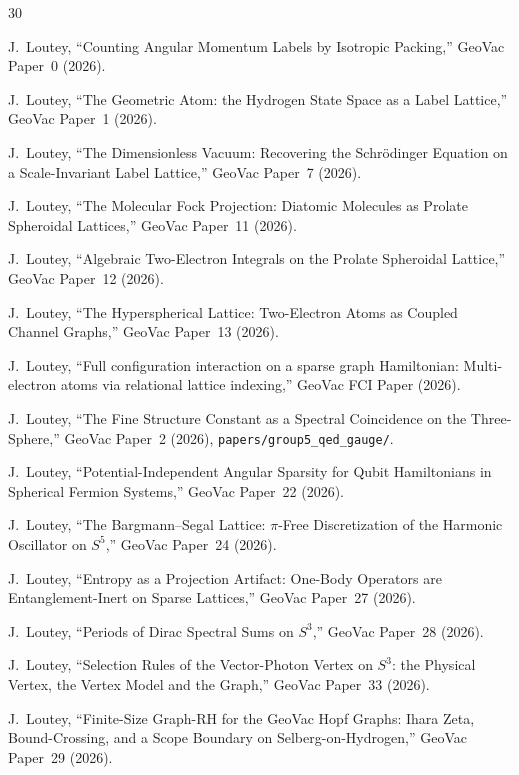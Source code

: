 \documentclass[aps,pra,twocolumn,superscriptaddress,longbibliography]{revtex4-2}
\begin{document}
\begin{thebibliography}{30}

J.~Loutey,
``Counting Angular Momentum Labels by Isotropic Packing,''
GeoVac Paper~0 (2026).

J.~Loutey,
``The Geometric Atom: the Hydrogen State Space as a Label Lattice,''
GeoVac Paper~1 (2026).

J.~Loutey,
``The Dimensionless Vacuum: Recovering the Schr\"odinger Equation
on a Scale-Invariant Label Lattice,''
GeoVac Paper~7 (2026).

J.~Loutey,
``The Molecular Fock Projection: Diatomic Molecules as Prolate
Spheroidal Lattices,''
GeoVac Paper~11 (2026).

J.~Loutey,
``Algebraic Two-Electron Integrals on the Prolate Spheroidal Lattice,''
GeoVac Paper~12 (2026).

J.~Loutey,
``The Hyperspherical Lattice: Two-Electron Atoms as Coupled
Channel Graphs,''
GeoVac Paper~13 (2026).

J.~Loutey,
``Full configuration interaction on a sparse graph Hamiltonian:
Multi-electron atoms via relational lattice indexing,''
GeoVac FCI Paper (2026).

J.~Loutey,
``The Fine Structure Constant as a Spectral Coincidence on the
Three-Sphere,''
GeoVac Paper~2 (2026), \texttt{papers/group5\_qed\_gauge/}.

J.~Loutey,
``Potential-Independent Angular Sparsity for Qubit Hamiltonians in
Spherical Fermion Systems,''
GeoVac Paper~22 (2026).

J.~Loutey,
``The Bargmann--Segal Lattice: $\pi$-Free Discretization of the
Harmonic Oscillator on $S^5$,''
GeoVac Paper~24 (2026).

J.~Loutey,
``Entropy as a Projection Artifact: One-Body Operators are
Entanglement-Inert on Sparse Lattices,''
GeoVac Paper~27 (2026).

J.~Loutey,
``Periods of Dirac Spectral Sums on $S^3$,''
GeoVac Paper~28 (2026).

J.~Loutey,
``Selection Rules of the Vector-Photon Vertex on $S^3$: the Physical
Vertex, the Vertex Model and the Graph,''
GeoVac Paper~33 (2026).

J.~Loutey,
``Finite-Size Graph-RH for the GeoVac Hopf Graphs: Ihara Zeta, Bound-Crossing, and a Scope Boundary on Selberg-on-Hydrogen,''
GeoVac Paper~29 (2026).


\end{thebibliography}
\end{document}
